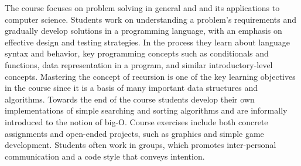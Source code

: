 \documentclass[submission,copyright,creativecommons]{eptcs}
\newcommand{\allcomments}[1]{{#1}}
\newcommand{\elenacomment}[1]{{\bf \textcolor{ForestGreen}{\allcomments{{#1}}}}}
\newcommand{\stephencomment}[1]{{\bf \color{StephensBlue}{\allcomments{{#1}}}}} %
\newcommand{\joecomment}[1]{{\bf \color{JoesGold}{\allcomments{{#1}}}}}
\begin{document}
The course focuses on problem solving in general and and its applications to computer science.
Students work on understanding a problem's requirements and gradually develop solutions in a programming language, with an emphasis on effective design and testing strategies. In the process they learn about language syntax and behavior, key programming concepts such as conditionals and functions, data representation in a program, and similar introductory-level concepts. Mastering the concept of recursion is one of the key learning objectives in the course since it is a basis of many important data structures and algorithms. 
Towards the end of the course students develop their own implementations of simple searching and sorting algorithms and are informally introduced to the notion of big-O. Course exercises include both concrete assignments and open-ended projects, such as graphics and simple game development. Students often work in groups, which promotes inter-personal communication and a code style that conveys intention. 

\end{document}
